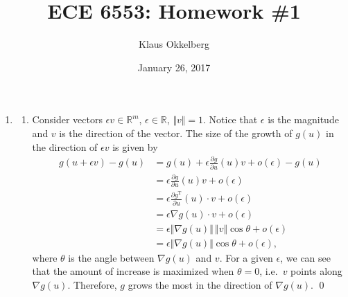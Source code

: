 \documentclass[letterpaper,12pt,titlepage]{article}
\newcommand{\trans}{^\text{T}}
\newcommand*\pder[2]{\frac{\partial #1}{\partial #2}}
\newcommand*\R{\mathbb{R}}
\begin{document}
\title{ECE 6553: Homework \#1}
\author{Klaus Okkelberg}
\date{January 26, 2017}
\maketitle


\begin{enumerate}[leftmargin=0pt]

\item \begin{enumerate}
  \item Consider vectors $\epsilon v\in\R^m$, $\epsilon\in\R$, $\Vert v\Vert=1$. Notice that $\epsilon$ is the magnitude and $v$ is the direction of the vector. The size of the growth of $g(u)$ in the direction of $\epsilon v$ is given by
    \begin{align}
      g(u+\epsilon v) - g(u) &= g(u) + \epsilon\pder{g}{u}(u)v + o(\epsilon) - g(u) \\
                             &= \epsilon\pder{g}{u}(u)v + o(\epsilon) \\
                             &= \epsilon \pder{g\trans}{u}(u) \cdot v + o(\epsilon) \\
                             &= \epsilon \nabla g(u) \cdot v + o(\epsilon) \\
                             &= \epsilon \Vert\nabla g(u)\Vert \, \Vert v\Vert \cos\theta + o(\epsilon) \\
                             &= \epsilon \Vert\nabla g(u)\Vert \cos\theta + o(\epsilon),
    \end{align}
    where $\theta$ is the angle between $\nabla g(u)$ and $v$. For a given $\epsilon$, we can see that the amount of increase is maximized when $\theta=0$, i.e.\ $v$ points along $\nabla g(u)$. Therefore, $g$ grows the most in the direction of $\nabla g(u)$. \qed
    


\end{enumerate}
\end{enumerate}
\end{document}
